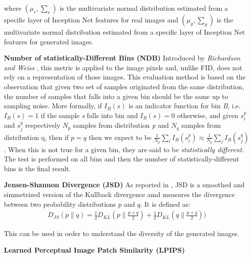 \documentclass[10pt,twocolumn,letterpaper]{article}
\begin{document}
where $\textstyle (\mu_{r} , \sum_{r})$ is the multivariate normal distribution estimated from a specific layer of Inception Net features for real images and $\textstyle (\mu_{g} , \sum_{g})$ is the multivariate normal distribution estimated from a specific layer of Inception Net features for generated images. 

\textbf{Number of statistically-Different Bins (NDB)} Introduced by \textit{Richardson and Weiss} \cite{ndb}, this metric is applied to the image pixels and, unlike FID, does not rely on a representation of those images. This evaluation method is based on the observation that given two set of samples originated from the same distribution, the number of samples that falls into a given bin should be the same up to sampling noise. More formally, if $I_{B}(s)$ is an indicator function for bin \textit{B}, i.e. $I_{B}(s)=1$ if the sample \textit{s} falls into bin  and $I_{B}(s)=0$ otherwise, and given ${s_{i}^{p}}$ and ${s_{j}^{q}}$ respectively ${N_{p}}$ samples from distribution \textit{p} and ${N_{q}}$ samples from distribution q, then if $p=q$ then we expect to be $\textstyle \frac{1}{N_p}\sum_{i}{I_B(s_{i}^{p})} \approx \frac{1}{N_q}\sum_{j}{I_B(s_{j}^{q})} $. When this is not true for a given bin, they are said to be \textit{statistically different}. The test is performed on all bins and then the number of statistically-different bins is the final result. 

\textbf{Jensen-Shannon Divergence (JSD)} As reported in \cite{jsd}, JSD is a smoothed and simmetrized version of the Kullback divergence amd measures the divergence between two probability distributions $p$ and $q$. It is defined as: 
\begin{equation}
	\begin{split}
		D_{JS}(p\|q) = \frac{1}{2}D_{KL}(p\|\frac{p+q}{2})+  \frac{1}{2}D_{KL}(q\|\frac{p+q}{2}))
	\end{split}
\end{equation}


This can be used in order to understand the diversity of the generated images.

\textbf{Learned Perceptual Image Patch Similarity (LPIPS)}


{\small


}
\end{document}
